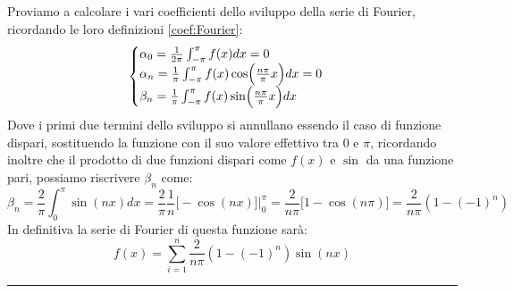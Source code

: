 
Proviamo a calcolare i vari coefficienti dello sviluppo della serie di Fourier, ricordando le loro definizioni \eqref{coef:Fourier}:
\begin{equation*}
    \begin{cases}
        \alpha_0 = \frac{1}{2\pi} \int_{-\pi}^{\pi} f(x)dx = 0 \\
        \alpha_n = \frac{1}{\pi} \int_{-\pi}^{\pi} f(x) \cos \Bigl( \frac{n\pi}{\pi}x \Bigr) dx = 0 \\
        \beta_n = \frac{1}{\pi} \int_{-\pi}^{\pi} f(x) \sin \Bigl( \frac{n\pi}{\pi}x \Bigr) dx
    \end{cases}
\end{equation*}
Dove i primi due termini dello sviluppo si annullano essendo il caso di funzione dispari, sostituendo la funzione con il suo valore effettivo tra $0$ e $\pi$, ricordando inoltre che il prodotto di due funzioni dispari come $f(x)$ e $\sin$ da una funzione pari, possiamo riscrivere $\beta_n$ come:
\begin{equation*}
    \beta_n = \frac{2}{\pi} \int_{0}^{\pi} \sin(nx)dx =
    \frac{2}{\pi} \frac{1}{n} \bigl[ -\cos(nx) \bigr] \bigg|_0^{\pi} =
    \frac{2}{n\pi} \bigl[ 1 - \cos(n\pi) \bigr] =
    \frac{2}{n\pi} (1-(-1)^n)
\end{equation*}
In definitiva la serie di Fourier di questa funzione sarà:
\begin{equation*}
    f(x) = \sum_{i=1}^{n} \frac{2}{n\pi} (1-(-1)^n) \sin(nx)
\end{equation*}

\par\noindent\rule[1pt]{\textwidth}{0.8pt}

